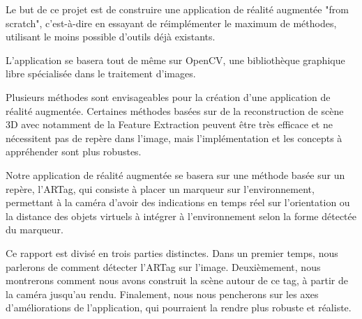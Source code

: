 
Le but de ce projet est de construire une application de réalité augmentée "from scratch", c'est-à-dire en essayant de réimplémenter le maximum de méthodes, utilisant le moins possible d'outils déjà existants.

L'application se basera tout de même sur OpenCV, une bibliothèque graphique libre spécialisée dans le traitement d'images.

Plusieurs méthodes sont envisageables pour la création d'une application de réalité augmentée. Certaines méthodes basées sur de la reconstruction de scène 3D avec notamment de la Feature Extraction peuvent être très efficace et ne nécessitent pas de repère dans l'image, mais l'implémentation et les concepts à appréhender sont plus robustes.

Notre application de réalité augmentée se basera sur une méthode basée sur un repère, l'ARTag, qui consiste à placer un marqueur sur l'environnement, permettant à la caméra d'avoir des indications en temps réel sur l'orientation ou la distance des objets virtuels à intégrer à l'environnement selon la forme détectée du marqueur. 

Ce rapport est divisé en trois parties distinctes. Dans un premier temps, nous parlerons de comment détecter l'ARTag sur l'image. Deuxièmement, nous montrerons comment nous avons construit la scène autour de ce tag, à partir de la caméra jusqu'au rendu. Finalement, nous nous pencherons sur les axes d'améliorations de l'application, qui pourraient la rendre plus robuste et réaliste.

